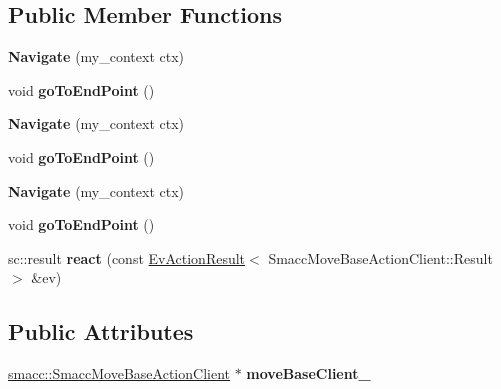 \subsection*{Public Member Functions}
\begin{DoxyCompactItemize}
\item 
\hypertarget{structNavigate_a6be585a62dc40f453857b649017b4e82}{{\bfseries Navigate} (my\-\_\-context ctx)}\label{structNavigate_a6be585a62dc40f453857b649017b4e82}

\item 
\hypertarget{structNavigate_a941523c9ba8391d3775d6b7f62fe1261}{void {\bfseries go\-To\-End\-Point} ()}\label{structNavigate_a941523c9ba8391d3775d6b7f62fe1261}

\item 
\hypertarget{structNavigate_a6be585a62dc40f453857b649017b4e82}{{\bfseries Navigate} (my\-\_\-context ctx)}\label{structNavigate_a6be585a62dc40f453857b649017b4e82}

\item 
\hypertarget{structNavigate_a941523c9ba8391d3775d6b7f62fe1261}{void {\bfseries go\-To\-End\-Point} ()}\label{structNavigate_a941523c9ba8391d3775d6b7f62fe1261}

\item 
\hypertarget{structNavigate_a6be585a62dc40f453857b649017b4e82}{{\bfseries Navigate} (my\-\_\-context ctx)}\label{structNavigate_a6be585a62dc40f453857b649017b4e82}

\item 
\hypertarget{structNavigate_a941523c9ba8391d3775d6b7f62fe1261}{void {\bfseries go\-To\-End\-Point} ()}\label{structNavigate_a941523c9ba8391d3775d6b7f62fe1261}

\item 
\hypertarget{structNavigate_ac058d0da392b7c5e1873702820595ae4}{sc\-::result {\bfseries react} (const \hyperlink{structsmacc_1_1EvActionResult}{Ev\-Action\-Result}$<$ Smacc\-Move\-Base\-Action\-Client\-::\-Result $>$ \&ev)}\label{structNavigate_ac058d0da392b7c5e1873702820595ae4}

\end{DoxyCompactItemize}
\subsection*{Public Attributes}
\begin{DoxyCompactItemize}
\item 
\hypertarget{structNavigate_a6ccf129ef69c3a8f664ecb8c367dae86}{\hyperlink{classsmacc_1_1SmaccMoveBaseActionClient}{smacc\-::\-Smacc\-Move\-Base\-Action\-Client} $\ast$ {\bfseries move\-Base\-Client\-\_\-}}\label{structNavigate_a6ccf129ef69c3a8f664ecb8c367dae86}

\end{DoxyCompactItemize}
